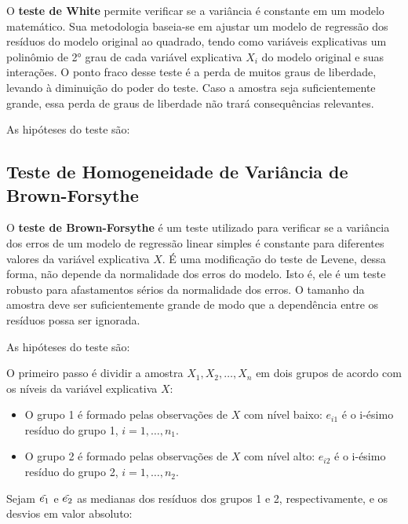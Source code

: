 \documentclass[
  portuguese,
]{estat/estat}
\providecommand{\tightlist}{%
  \setlength{\itemsep}{0pt}\setlength{\parskip}{0pt}}
\begin{document}
O \textbf{teste de White} permite verificar se a variância é constante
em um modelo matemático. Sua metodologia baseia-se em ajustar um modelo
de regressão dos resíduos do modelo original ao quadrado, tendo como
variáveis explicativas um polinômio de 2° grau de cada variável
explicativa \(X_i\) do modelo original e suas interações. O ponto fraco
desse teste é a perda de muitos graus de liberdade, levando à diminuição
do poder do teste. Caso a amostra seja suficientemente grande, essa
perda de graus de liberdade não trará consequências relevantes.

As hipóteses do teste são:


\subsection{Teste de Homogeneidade de Variância de
Brown-Forsythe}\label{teste-de-homogeneidade-de-variuxe2ncia-de-brown-forsythe}

O \textbf{teste de Brown-Forsythe} é um teste utilizado para verificar
se a variância dos erros de um modelo de regressão linear simples é
constante para diferentes valores da variável explicativa \(X\). É uma
modificação do teste de Levene, dessa forma, não depende da normalidade
dos erros do modelo. Isto é, ele é um teste robusto para afastamentos
sérios da normalidade dos erros. O tamanho da amostra deve ser
suficientemente grande de modo que a dependência entre os resíduos possa
ser ignorada.

As hipóteses do teste são:


O primeiro passo é dividir a amostra \(X_1, X_2, \ldots, X_n\) em dois
grupos de acordo com os níveis da variável explicativa \(X\):

\begin{itemize}
\tightlist
\item
  O grupo 1 é formado pelas observações de \(X\) com nível baixo:
  \(e_{i1}\) é o i-ésimo resíduo do grupo 1, \(i = 1, \ldots, n_1\).
\item
  O grupo 2 é formado pelas observações de \(X\) com nível alto:
  \(e_{i2}\) é o i-ésimo resíduo do grupo 2, \(i = 1, \ldots, n_2\).
\end{itemize}

Sejam \(\Tilde{e_1}\) e \(\Tilde{e_2}\) as medianas dos resíduos dos
grupos 1 e 2, respectivamente, e os desvios em valor absoluto:
\end{document}
